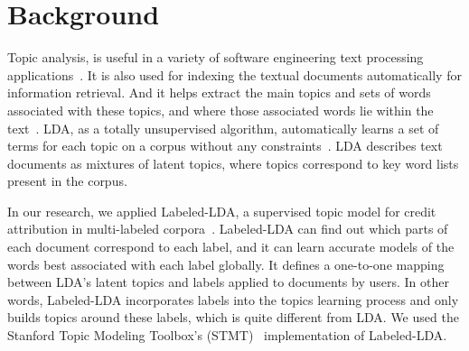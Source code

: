 \documentclass[10pt, conference, compsocconf]{IEEEtran}
\begin{document}
\section{Background}
\label{sec:background}


Topic analysis,  is useful in a variety of software engineering text
processing applications~\cite{hindle9s}. 
It is also used for
indexing the textual documents automatically for information retrieval. %
And it helps extract the main topics and sets of 
words associated with these topics, and where those associated words lie within
the text~\cite{li2003topic}. 
LDA, as a totally unsupervised algorithm, automatically learns a set
of terms for each topic on a corpus without any constraints~\cite{blei2003}.
LDA describes text documents as
mixtures of latent topics, where topics correspond to key word lists
present in the corpus.

In our research, we applied Labeled-LDA, 
a supervised topic model for credit
attribution in multi-labeled corpora~\cite{labeledlda}.
Labeled-LDA can find out which parts of each document correspond to each label,
and it can learn accurate models of the words best associated with each label globally\cite{stmt}.
 It defines a
one-to-one mapping between LDA's latent topics and labels applied to
documents by 
users. In other words, Labeled-LDA incorporates labels into
the topics learning process and only builds topics around these labels,
which is quite different from LDA. 
We used the Stanford Topic Modeling Toolbox's
(STMT)~\cite{stmt} implementation of Labeled-LDA. 

\end{document}
